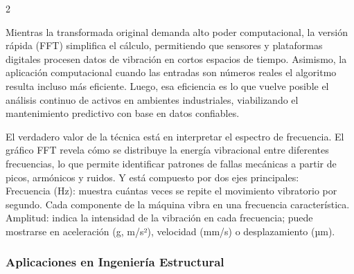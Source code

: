 \documentclass[10pt]{article}
\begin{document}
\begin{multicols}{2}
\begin{center}
\end{center}
Mientras la transformada original demanda alto poder computacional, la versión rápida (FFT) simplifica el cálculo, permitiendo que sensores y plataformas digitales procesen datos de vibración en cortos espacios de tiempo.  Asimismo, la aplicación computacional cuando las entradas son números reales el algoritmo resulta incluso más eficiente. Luego, esa eficiencia es lo que vuelve posible el análisis continuo de activos en ambientes industriales, viabilizando el mantenimiento predictivo con base en datos confiables.

El verdadero valor de la técnica está en interpretar el espectro de frecuencia.
El gráfico FFT revela cómo se distribuye la energía vibracional entre diferentes frecuencias, lo que permite identificar patrones de fallas mecánicas a partir de picos, armónicos y ruidos. Y está compuesto por dos ejes principales:\\
Frecuencia (Hz): muestra cuántas veces se repite el movimiento vibratorio por segundo. Cada componente de la máquina vibra en una frecuencia característica.\\
Amplitud: indica la intensidad de la vibración en cada frecuencia; puede mostrarse en aceleración (g, m/s²), velocidad (mm/s) o desplazamiento (µm). 

\subsubsection{Aplicaciones en Ingeniería Estructural}


\end{multicols}
\end{document}
